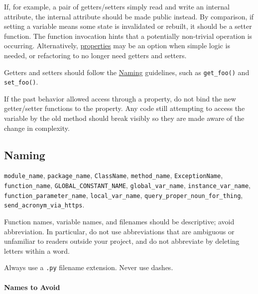 \documentclass[
]{article}
\begin{document}
If, for example, a pair of getters/setters simply read and write an
internal attribute, the internal attribute should be made public
instead. By comparison, if setting a variable means some state is
invalidated or rebuilt, it should be a setter function. The function
invocation hints that a potentially non-trivial operation is occurring.
Alternatively, \hyperref[properties]{properties} may be an option when
simple logic is needed, or refactoring to no longer need getters and
setters.

Getters and setters should follow the \hyperref[s3.16-naming]{Naming}
guidelines, such as \texttt{get\_foo()} and \texttt{set\_foo()}.

If the past behavior allowed access through a property, do not bind the
new getter/setter functions to the property. Any code still attempting
to access the variable by the old method should break visibly so they
are made aware of the change in complexity.

\subsection{Naming}

\texttt{module\_name}, \texttt{package\_name}, \texttt{ClassName},
\texttt{method\_name}, \texttt{ExceptionName}, \texttt{function\_name},
\texttt{GLOBAL\_CONSTANT\_NAME}, \texttt{global\_var\_name},
\texttt{instance\_var\_name}, \texttt{function\_parameter\_name},
\texttt{local\_var\_name}, \texttt{query\_proper\_noun\_for\_thing},
\texttt{send\_acronym\_via\_https}.

Function names, variable names, and filenames should be descriptive;
avoid abbreviation. In particular, do not use abbreviations that are
ambiguous or unfamiliar to readers outside your project, and do not
abbreviate by deleting letters within a word.

Always use a \texttt{.py} filename extension. Never use dashes.

\paragraph{Names to Avoid}
\end{document}

